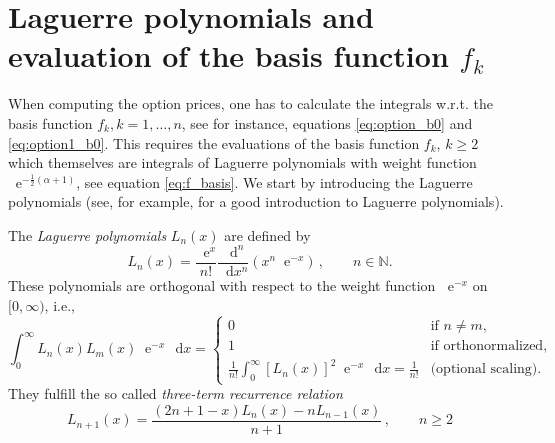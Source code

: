 \documentclass[10pt,a4paper,reqno]{amsart}
\newcommand*\D{\mathop{}\!\mathrm{d}}
\newcommand*\E{\mathop{}\!\mathrm{e}}
\numberwithin{equation}{section}
\theoremstyle{plain}
\theoremstyle{definition}
\theoremstyle{example}
\begin{document}
\appendix

\section{Laguerre polynomials and evaluation of the basis function \texorpdfstring{$f_k$}{fk}}\label{sec:appendix1}
When computing the option prices, one has to calculate the integrals w.r.t. the basis function $f_k, k=1, \ldots, n$, see for instance, equations \eqref{eq:option_b0} and \eqref{eq:option1_b0}. This requires the evaluations of the basis function $f_k$, $k\geq 2$ which themselves are integrals of Laguerre polynomials with weight function $\E^{-\frac{1}{2}(\alpha+1)}$, see equation \eqref{eq:f_basis}. We start by introducing the Laguerre polynomials (see, for example, \cite[Chapter V]{freud2014orthogonal} for a good introduction to Laguerre polynomials).

The \textit{Laguerre polynomials} $L_n(x)$ are defined by
$$
L_n(x) = \frac{\E^x}{n!} \frac{\D^n}{\D x^n} \left( x^n \E^{-x} \right)\,, \qquad n\in \mathbb{N}.
$$
These polynomials are orthogonal with respect to the weight function $\E^{-x}$ on $[0, \infty)$, i.e.,
$$
\int_0^\infty L_n(x) L_m(x) \E^{-x} \, \D x = 
\begin{cases}
0 & \text{if } n \neq m, \\
1 & \text{if orthonormalized}, \\
\frac{1}{n!} \int_0^\infty \left[L_n(x)\right]^2 \E^{-x} \, \D x = \frac{1}{n!} & \text{(optional scaling)}.
\end{cases}
$$
They fulfill the so called \textit{three-term recurrence relation}
\begin{equation}\label{eq:reccurence}
L_{n+1}(x) = \frac{(2n + 1 - x) L_n(x) - n L_{n-1}(x)}{n + 1}\,,\qquad n\geq 2
\end{equation}
\end{document}
